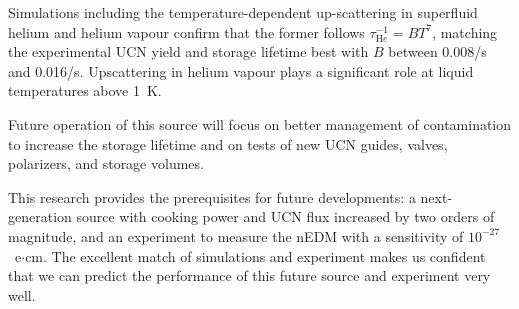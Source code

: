 Simulations including the temperature-dependent up-scattering in
superfluid helium and helium vapour confirm that the former follows
$\tau_{\mathrm He} ^{-1} = B T^7$, matching the experimental UCN yield
and storage lifetime best with $B$ between 0.008/s and
0.016/s. Upscattering in helium vapour plays a significant role at
liquid temperatures above 1~K.

Future operation of this source will focus on better management of
contamination to increase the storage lifetime and on tests of new UCN
guides, valves, polarizers, and storage volumes.

This research provides the prerequisites for future developments: a
next-generation source with cooking power and UCN flux increased by
two orders of magnitude, and an experiment to measure the nEDM with a
sensitivity of $10^{-27}$~e$\cdot$cm. The excellent match of
simulations and experiment makes us confident that we can predict the
performance of this future source and experiment very well.









  
  
  

